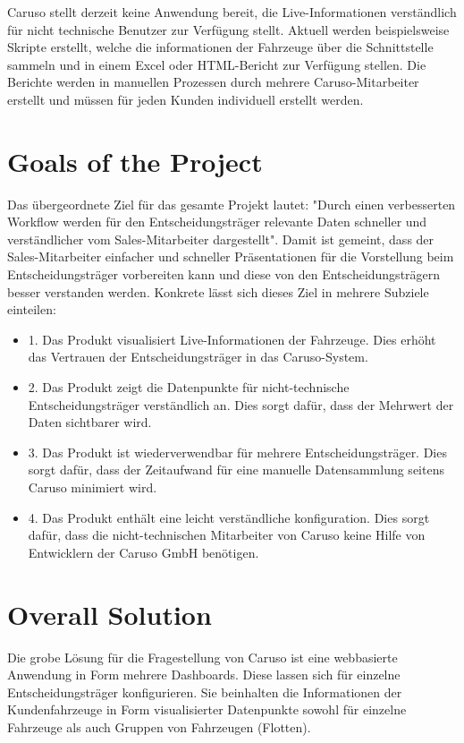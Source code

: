 Caruso stellt derzeit keine Anwendung bereit, die Live-Informationen verständlich für nicht technische Benutzer zur Verfügung stellt. Aktuell werden beispielsweise Skripte erstellt, welche die informationen der Fahrzeuge über die Schnittstelle sammeln und in einem Excel oder HTML-Bericht zur Verfügung stellen. Die Berichte werden in manuellen Prozessen durch mehrere Caruso-Mitarbeiter erstellt und müssen für jeden Kunden individuell erstellt werden.
\section{Goals of the Project}
Das übergeordnete Ziel für das gesamte Projekt lautet: "Durch einen verbesserten Workflow werden für den Entscheidungsträger relevante Daten schneller und verständlicher vom Sales-Mitarbeiter dargestellt". Damit ist gemeint, dass der Sales-Mitarbeiter einfacher und schneller Präsentationen für die Vorstellung beim Entscheidungsträger vorbereiten kann und diese von den Entscheidungsträgern besser verstanden werden. Konkrete lässt sich dieses Ziel in mehrere Subziele einteilen:
\begin{itemize}
  \item 1. Das Produkt visualisiert Live-Informationen der Fahrzeuge. Dies erhöht das Vertrauen der Entscheidungsträger in das Caruso-System.
  \item 2. Das Produkt zeigt die Datenpunkte für nicht-technische Entscheidungsträger verständlich an. Dies sorgt dafür, dass der Mehrwert der Daten sichtbarer wird.
  \item 3. Das Produkt ist wiederverwendbar für mehrere Entscheidungsträger. Dies sorgt dafür, dass der Zeitaufwand für eine manuelle Datensammlung seitens Caruso minimiert wird.
  \item 4. Das Produkt enthält eine leicht verständliche konfiguration. Dies sorgt dafür, dass die nicht-technischen Mitarbeiter von Caruso keine Hilfe von Entwicklern der Caruso GmbH benötigen.
\end{itemize}

\section{Overall Solution}
Die grobe Lösung für die Fragestellung von Caruso ist eine webbasierte Anwendung in Form mehrere Dashboards. Diese lassen sich für einzelne Entscheidungsträger konfigurieren. Sie beinhalten die Informationen der Kundenfahrzeuge in Form visualisierter Datenpunkte sowohl für einzelne Fahrzeuge als auch Gruppen von Fahrzeugen (Flotten).